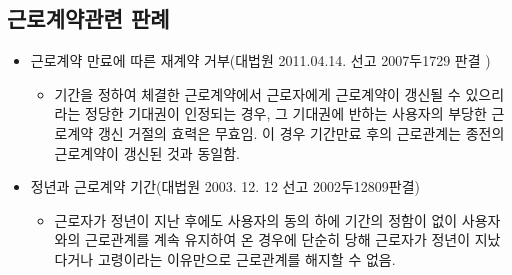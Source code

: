 \subsection{근로계약관련 판례}
\begin{itemize}[□]\tightlist 
\item 근로계약 만료에 따른 재계약 거부(대법원 2011.04.14. 선고 2007두1729 판결 )
	\begin{itemize}[-]\tightlist
	\item 기간을 정하여 체결한 근로계약에서 근로자에게 근로계약이 갱신될 수 있으리라는 정당한 기대권이 인정되는 경우, 그 기대권에 반하는 사용자의
    부당한 근로계약 갱신 거절의 효력은 무효임. 이 경우 기간만료 후의 근로관계는 종전의 근로계약이 갱신된 것과 동일함.
	\end{itemize}
 
\item 정년과 근로계약 기간(대법원 2003. 12. 12 선고 2002두12809판결)
	\begin{itemize}[-]\tightlist
	\item 근로자가 정년이 지난 후에도 사용자의 동의 하에 기간의 정함이 없이 사용자와의 근로관계를 계속 유지하여 온 경우에 단순히 당해 근로자가 
    정년이 지났다거나 고령이라는 이유만으로 근로관계를 해지할 수 없음. 
	\end{itemize}
\end{itemize}